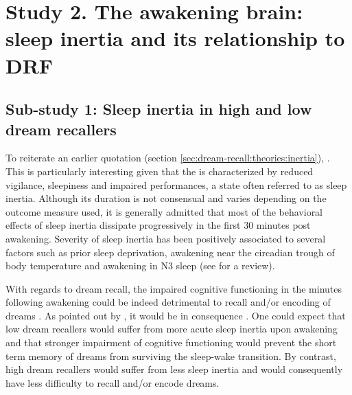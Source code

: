 \section{Study 2. The awakening brain: sleep inertia and its relationship to DRF}
\label{sec:problematic:inertia}

\subsection{Sub-study 1: Sleep inertia in high and low dream recallers}
\label{sec:problematic:inertia:drf}

To reiterate an earlier quotation (section \ref{sec:dream-recall:theories:inertia}),  \citep{conduit_poor_2004}. This is particularly interesting given that the  is characterized by reduced vigilance, sleepiness and impaired performances, a state often referred to as sleep inertia. Although its duration is not consensual and varies depending on the outcome measure used, it is generally admitted that most of the behavioral effects of sleep inertia dissipate progressively in the first 30 minutes post awakening. Severity of sleep inertia has been positively associated to several factors such as prior sleep deprivation, awakening near the circadian trough of body temperature and awakening in N3 sleep (see \citealp{tassi_sleep_2000} for a review).

With regards to dream recall, the impaired cognitive functioning in the minutes following awakening could be indeed detrimental to recall and/or encoding of dreams \citep{conduit_poor_2004}. As pointed out by \citet{schredl_factors_2003}, it would be in consequence . One could expect that low dream recallers would suffer from more acute sleep inertia upon awakening and that stronger impairment of cognitive functioning would prevent the short term memory of dreams from surviving the sleep-wake transition. By contrast, high dream recallers would suffer from less sleep inertia and would consequently have less difficulty to recall and/or encode dreams.

